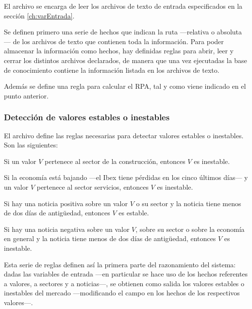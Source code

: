\documentclass[a4paper, 11pt, titlepage]{article}
\begin{document}
    El archivo  se encarga de leer los archivos de texto de entrada especificados en la sección \ref{ch:varEntrada}.

    Se definen primero una serie de hechos que indican la ruta ---relativa o absoluta--- de los archivos de texto que contienen toda la información. Para poder almacenar la información como hechos, hay definidas reglas para abrir, leer y cerrar los distintos archivos declarados, de manera que una vez ejecutadas la base de conocimiento contiene la información listada en los archivos de texto.

    Además se define una regla para calcular el RPA, tal y como viene indicado en el punto anterior.

    \subsubsection*{Detección de valores estables o inestables}

    El archivo  define las reglas necesarias para detectar valores estables o inestables. Son las siguientes:

    \begin{regla}
        Si un valor $V$ pertenece al sector de la construcción, entonces $V$ es inestable.
    \end{regla}

    \begin{regla}
        Si la economía está bajando ---el Ibex tiene pérdidas en los cinco últimos días--- y un valor $V$ pertenece al sector servicios, entonces $V$ es inestable.
    \end{regla}

    \begin{regla}
        Si hay una noticia positiva sobre un valor $V$ o su sector y la noticia tiene menos de dos días de antigüedad, entonces $V$ es estable.
    \end{regla}

    \begin{regla}
        Si hay una noticia negativa sobre un valor $V$, sobre su sector o sobre la economía en general y la noticia tiene menos de dos días de antigüedad, entonces $V$ es inestable.
    \end{regla}

    Esta serie de reglas definen así la primera parte del razonamiento del sistema: dadas las variables de entrada ---en particular se hace uso de los hechos referentes a valores, a sectores y a noticias---, se obtienen como salida los valores estables o inestables del mercado ---modificando el campo  en los hechos de los respectivos valores---.
\end{document}
